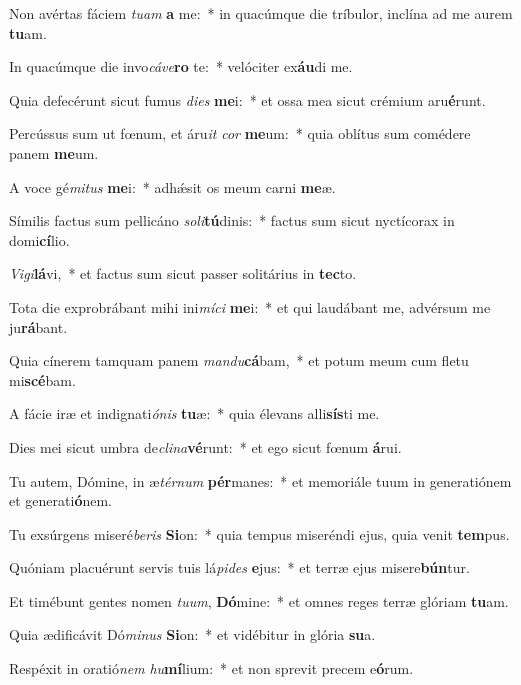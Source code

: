 \item Non avértas fáciem \textit{tu}\textit{am} \textbf{a} me:~* in quacúmque die tríbulor, inclína ad me aurem \textbf{tu}am.
\item In quacúmque die invo\textit{cá}\textit{ve}\textbf{ro} te:~* velóciter ex\textbf{áu}di me.
\item Quia defecérunt sicut fumus \textit{di}\textit{es} \textbf{me}i:~* et ossa mea sicut crémium aru\textbf{é}runt.
\item Percússus sum ut fœnum, et áru\textit{it} \textit{cor} \textbf{me}um:~* quia oblítus sum comédere panem \textbf{me}um.
\item A voce gé\textit{mi}\textit{tus} \textbf{me}i:~* adhǽsit os meum carni \textbf{me}æ.
\item Símilis factus sum pellicáno \textit{so}\textit{li}\textbf{tú}dinis:~* factus sum sicut nyctícorax in domi\textbf{cí}lio.
\item \textit{Vi}\textit{gi}\textbf{lá}vi,~* et factus sum sicut passer solitárius in \textbf{tec}to.
\item Tota die exprobrábant mihi ini\textit{mí}\textit{ci} \textbf{me}i:~* et qui laudábant me, advérsum me ju\textbf{rá}bant.
\item Quia cínerem tamquam panem \textit{man}\textit{du}\textbf{cá}bam,~* et potum meum cum fletu mi\textbf{scé}bam.
\item A fácie iræ et indignati\textit{ó}\textit{nis} \textbf{tu}æ:~* quia élevans alli\textbf{sís}ti me.
\item Dies mei sicut umbra de\textit{cli}\textit{na}\textbf{vé}runt:~* et ego sicut fœnum \textbf{á}rui.
\item Tu autem, Dómine, in æ\textit{tér}\textit{num} \textbf{pér}manes:~* et memoriále tuum in generatiónem et generati\textbf{ó}nem.
\item Tu exsúrgens miseré\textit{be}\textit{ris} \textbf{Si}on:~* quia tempus miseréndi ejus, quia venit \textbf{tem}pus.
\item Quóniam placuérunt servis tuis lá\textit{pi}\textit{des} \textbf{e}jus:~* et terræ ejus misere\textbf{bún}tur.
\item Et timébunt gentes nomen \textit{tu}\textit{um}, \textbf{Dó}mine:~* et omnes reges terræ glóriam \textbf{tu}am.
\item Quia ædificávit Dó\textit{mi}\textit{nus} \textbf{Si}on:~* et vidébitur in glória \textbf{su}a.
\item Respéxit in oratió\textit{nem} \textit{hu}\textbf{mí}lium:~* et non sprevit precem e\textbf{ó}rum.
